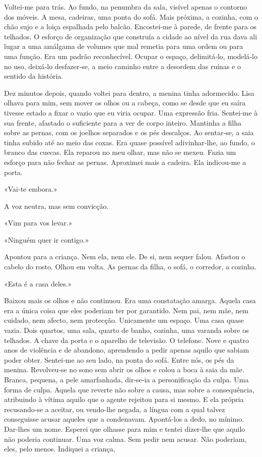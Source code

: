 Voltei­‑me para trás. Ao fundo, na penumbra da sala, visível apenas o
contorno dos móveis. A mesa, cadeiras, uma ponta do sofá. Mais próxima,
a cozinha, com o chão sujo e a loiça espalhada pelo balcão. Encostei­‑me
à parede, de frente para os telhados. O esforço de organização que
construía a cidade ao nível da rua dava ali lugar a uma amálgama de
volumes que mal remetia para uma ordem ou para uma função. Era um padrão
reconhecível. Ocupar o espaço, delimitá­‑lo, modelá­‑lo no uso,
deixá­‑lo desfazer­‑se, a meio caminho entre a desordem das ruínas e o
sentido da história.

Dez minutos depois, quando voltei para dentro, a menina tinha
adormecido. Lisa olhava para mim, sem mover os olhos ou a cabeça, como
se desde que eu saíra tivesse estado a fixar o vazio que eu viria
ocupar. Uma expressão fria. Sentei­‑me à sua frente, afastado o
suficiente para a ver de corpo inteiro. Mantinha a filha sobre as
pernas, com os joelhos separados e os pés descalços. Ao sentar­‑se, a
saia tinha subido até ao meio das coxas. Era quase possível
adivinhar­‑lhe, ao fundo, o branco das cuecas. Ela reparou no meu olhar,
mas não se mexeu. Fazia um esforço para não fechar as pernas. Aproximei
mais a cadeira. Ela indicou­‑me a porta.

«Vai­‑te embora.»

A voz neutra, mas sem convicção.

«Vim para vos levar.»

«Ninguém quer ir contigo.»

Apontou para a criança. Nem ela, nem ele. De si, nem sequer falou.
Afastou o cabelo do rosto. Olhou em volta. As pernas da filha, o sofá, o
corredor, a cozinha.

«Esta é a casa deles.»

Baixou mais os olhos e não continuou. Era uma constatação amarga. Aquela
casa era a única coisa que eles poderiam ter por garantido. Nem pai, nem
mãe, nem cuidado, nem afecto, nem protecção. Unicamente um espaço. Uma
casa quase vazia. Dois quartos, uma sala, quarto de banho, cozinha, uma
varanda sobre os telhados. A chave da porta e o aparelho de televisão. O
telefone. Nove e quatro anos de violência e de abandono, aprendendo a
pedir apenas aquilo que sabiam poder obter. Sentei­‑me ao seu lado, na
ponta do sofá. Entre nós, os pés da menina. Revolveu­‑se no sono sem
abrir os olhos e colou a boca à saia da mãe. Branca, pequena, a pele
amarfanhada, dir­‑se­‑ia a personificação da culpa. Uma forma de culpa.
Aquela que reverte não sobre a causa, mas sobre a consequência,
atribuindo à vítima aquilo que o agente rejeitou para si mesmo. E ela
própria recusando­‑se a aceitar, ou vendo­‑lhe negada, a língua com a
qual talvez conseguisse acusar aqueles que a condenavam. Apontá­‑los a
dedo, no mínimo. Dar­‑lhes um nome. Esperei que olhasse para mim e
tentei dizer­‑lhe que aquilo não poderia continuar. Uma voz calma. Sem
pedir nem acusar. Não poderiam, eles, pelo menos. Indiquei a criança,

